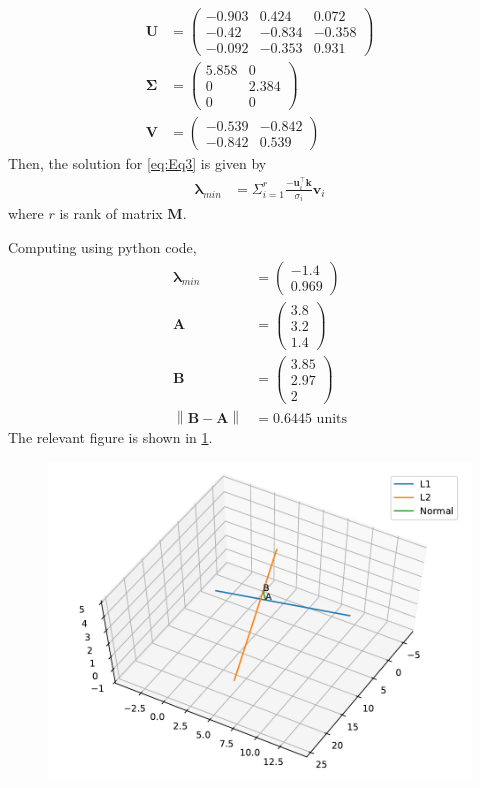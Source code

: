 \documentclass[12pt]{article}
\providecommand{\norm}[1]{\left\lVert#1\right\rVert}
\newcommand{\myvec}[1]{\ensuremath{\begin{pmatrix}#1\end{pmatrix}}}
\let\vec\mathbf
\begin{document}
\begin{enumerate}
\begin{align}
	\vec{U} &= \myvec{-0.903 & 0.424 & 0.072 \\
	                   -0.42 & -0.834 & -0.358 \\
			  -0.092 &-0.353& 0.931} \\
	\vec{\Sigma} &= \myvec{5.858 & 0 \\
	                      0 & 2.384 \\
			      0 & 0 } \\
	 \vec{V} &= \myvec{ -0.539 & -0.842 \\
	                    -0.842 & 0.539}
\end{align}
Then, the solution for \eqref{eq:Eq3} is given by
\begin{align}
	\label{eq:Eq4}
	\bm{\lambda}_{min} &= \Sigma_{i=1}^r\frac{-\vec{u}_i^\top\vec{k}}{\sigma_i}\vec{v}_i
\end{align}
where $r$ is rank of matrix $\vec{M}$.

Computing using python code,
\begin{align}
	\bm{\lambda}_{min} &=  \myvec{-1.4 \\ 0.969} \\ 
	\vec{A} &= \myvec{3.8\\3.2\\ 1.4}\\
	\vec{B} &= \myvec{3.85\\2.97\\ 2}\\
	\norm{\vec{B}-\vec{A}} &= 0.6445 \text{ units}
\end{align}
The relevant figure is shown in \ref{fig:Fig1}. 
\begin{figure}[!h]
	\begin{center}
		\includegraphics[width=\columnwidth]{figs/problem30.pdf}
	\end{center}
\caption{}
\label{fig:Fig1}
\end{figure}
\end{enumerate}
\end{document}
